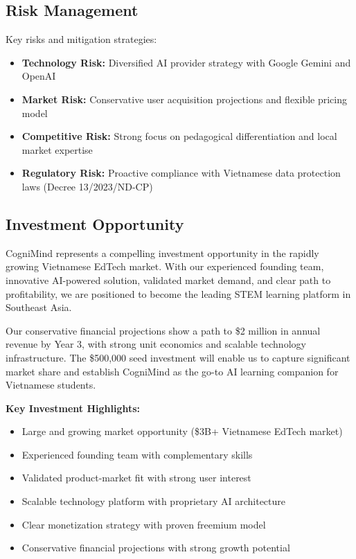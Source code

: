 \subsection{Risk Management}
Key risks and mitigation strategies:

\begin{itemize}
    \item \textbf{Technology Risk:} Diversified AI provider strategy with Google Gemini and OpenAI
    \item \textbf{Market Risk:} Conservative user acquisition projections and flexible pricing model
    \item \textbf{Competitive Risk:} Strong focus on pedagogical differentiation and local market expertise
    \item \textbf{Regulatory Risk:} Proactive compliance with Vietnamese data protection laws (Decree 13/2023/ND-CP)
\end{itemize}

\subsection{Investment Opportunity}
CogniMind represents a compelling investment opportunity in the rapidly growing Vietnamese EdTech market. With our experienced founding team, innovative AI-powered solution, validated market demand, and clear path to profitability, we are positioned to become the leading STEM learning platform in Southeast Asia.

Our conservative financial projections show a path to \$2 million in annual revenue by Year 3, with strong unit economics and scalable technology infrastructure. The \$500,000 seed investment will enable us to capture significant market share and establish CogniMind as the go-to AI learning companion for Vietnamese students.

\textbf{Key Investment Highlights:}
\begin{itemize}
    \item Large and growing market opportunity (\$3B+ Vietnamese EdTech market)
    \item Experienced founding team with complementary skills
    \item Validated product-market fit with strong user interest
    \item Scalable technology platform with proprietary AI architecture
    \item Clear monetization strategy with proven freemium model
    \item Conservative financial projections with strong growth potential
\end{itemize}
